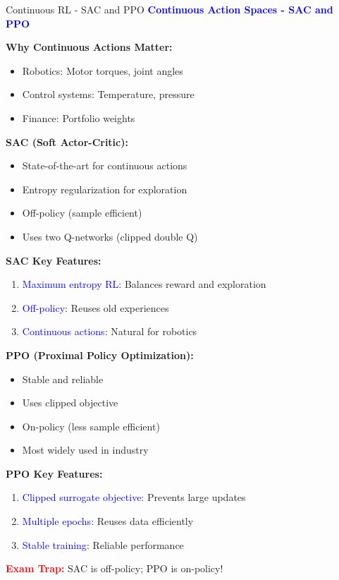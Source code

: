 \documentclass[8pt]{beamer}
\begin{document}
\begin{frame}{Continuous RL - SAC and PPO}
\fontsize{6.5}{7.5}\selectfont
\textcolor{blue}{\textbf{Continuous Action Spaces - SAC and PPO}}

\textbf{Why Continuous Actions Matter:}
\begin{itemize}
\item Robotics: Motor torques, joint angles
\item Control systems: Temperature, pressure
\item Finance: Portfolio weights
\end{itemize}

\textbf{SAC (Soft Actor-Critic):}
\begin{itemize}
\item State-of-the-art for continuous actions
\item Entropy regularization for exploration
\item Off-policy (sample efficient)
\item Uses two Q-networks (clipped double Q)
\end{itemize}

\textbf{SAC Key Features:}
\begin{enumerate}
\item \textcolor{blue}{Maximum entropy RL}: Balances reward and exploration
\item \textcolor{blue}{Off-policy}: Reuses old experiences
\item \textcolor{blue}{Continuous actions}: Natural for robotics
\end{enumerate}

\textbf{PPO (Proximal Policy Optimization):}
\begin{itemize}
\item Stable and reliable
\item Uses clipped objective
\item On-policy (less sample efficient)
\item Most widely used in industry
\end{itemize}

\textbf{PPO Key Features:}
\begin{enumerate}
\item \textcolor{blue}{Clipped surrogate objective}: Prevents large updates
\item \textcolor{blue}{Multiple epochs}: Reuses data efficiently
\item \textcolor{blue}{Stable training}: Reliable performance
\end{enumerate}

\textcolor{red}{\textbf{Exam Trap:}} SAC is off-policy; PPO is on-policy!
\end{frame}
\end{document}
